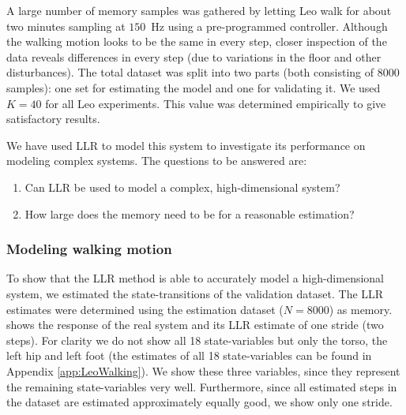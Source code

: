A large number of memory samples was gathered by letting Leo walk for about two minutes sampling at $150$~Hz using a pre-programmed controller. Although the walking motion looks to be the same in every step, closer inspection of the data reveals differences in every step (due to variations in the floor and other disturbances). The total dataset was split into two parts (both consisting of 8000 samples): one set for estimating the model and one for validating it. We used $K = 40$ for all Leo experiments. This value was determined empirically to give satisfactory results.

We have used \ac{LLR} to model this system to investigate its performance on modeling complex systems. The questions to be answered are:
\begin{enumerate}
	\item Can \ac{LLR} be used to model a complex, high-dimensional system?
	\item How large does the memory need to be for a reasonable estimation?
\end{enumerate}



\subsubsection{Modeling walking motion}\label{sec:LLR-Leo_FullMemory} 
To show that the \ac{LLR} method is able to accurately model a high-dimensional system, we estimated the state-transitions of the validation dataset. The \ac{LLR} estimates were determined using the estimation dataset ($N=8000$) as memory.  shows the response of the real system and its \ac{LLR} estimate of one stride (two steps). For clarity we do not show all 18 state-variables but only the torso, the left hip and left foot (the estimates of all 18 state-variables can be found in Appendix \ref{app:LeoWalking}). We show these three variables, since they represent the remaining state-variables very well. Furthermore, since all estimated steps in the dataset are estimated approximately equally good, we show only one stride. 

